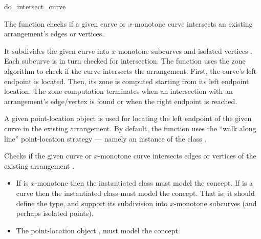 \ccRefPageBegin

\begin{ccRefFunction}{do_intersect_curve}

\ccDefinition

The function \ccRefName{} checks if a given curve or $x$-monotone
curve intersects an existing arrangement's edges or vertices. 

It subdivides the given curve into $x$-monotone subcurves and isolated
vertices . Each subcurve is in turn checked for intersection.
The function uses the zone algorithm to check if the curve intersects
the arrangement. First, the curve's left endpoint is located. Then, 
its zone is computed starting from its left endpoint location. The
zone computation terminates when an intersection with an arrangement's
edge/vertex is found or when the right endpoint is reached. 

A given point-location object is used for locating the left endpoint 
of the given curve in the existing arrangement. By default, the function 
uses the ``walk along line'' point-location strategy --- namely an 
instance of the class 
.



Checks if the given curve or $x$-monotone curve  intersects
  edges or vertices of the existing arrangement .


\ccRequirements
\begin{itemize}
\item If  is $x$-monotone then the instantiated 
  class must model the   concept. If
   is a curve then the instantiated  class must
  model the  concept. That is, it should
  define the  type, and support its subdivision into
  $x$-monotone subcurves (and perhaps isolated points).
\item The point-location object , must model the
   concept.
\end{itemize}

\end{ccRefFunction}

\ccRefPageEnd
